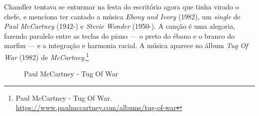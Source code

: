 Chandler tentava se enturmar na festa do escritório agora que tinha
virado o chefe, e menciona ter cantado a música \emph{Ebony and Ivory}
(1982), um \emph{single} de \emph{Paul McCartney} (1942-) e \emph{Stevie
Wonder} (1950-). A canção é uma alegoria, fazendo paralelo entre as
teclas do piano --- o preto do ébano e o branco do marfim --- e a
integração e harmonia racial. A música aparece no álbum \emph{Tug Of
War} (1982) de \emph{McCartney}.\footnote{\sloppy Paul McCartney - Tug Of War. \url{https://www.paulmccartney.com/albums/tug-of-war}}

\begin{figure}
  \centering
    \caption{Paul McCartney - Tug Of War\label{fig:paul-mc-cartney-tug-of-war}}
\end{figure}
